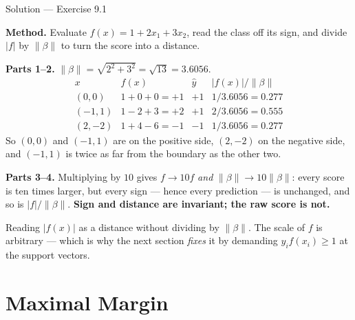 \documentclass[aspectratio=169,11pt]{beamer}
\begin{document}
\begin{frame}{Solution --- Exercise 9.1}
\begin{solutionbox}
  \scriptsize
  \textbf{Method.} Evaluate $f(x)=1+2x_1+3x_2$, read the class off its sign,
  and divide $|f|$ by $\|\beta\|$ to turn the score into a distance.

  \textbf{Parts 1--2.} $\|\beta\|=\sqrt{2^2+3^2}=\sqrt{13}=3.6056$.
  \[
    \begin{array}{l|c|c|c}
      x & f(x) & \hat y & |f(x)|/\|\beta\| \\ \hline
      (0,0)  & 1+0+0 = +1 & +1 & 1/3.6056 = 0.277 \\
      (-1,1) & 1-2+3 = +2 & +1 & 2/3.6056 = 0.555 \\
      (2,-2) & 1+4-6 = -1 & -1 & 1/3.6056 = 0.277
    \end{array}
  \]
  So $(0,0)$ and $(-1,1)$ are on the positive side, $(2,-2)$ on the negative
  side, and $(-1,1)$ is twice as far from the boundary as the other two.

  \textbf{Parts 3--4.} Multiplying by $10$ gives $f\to 10f$ \emph{and}
  $\|\beta\|\to 10\|\beta\|$: every score is ten times larger, but every sign
  --- hence every prediction --- is unchanged, and so is $|f|/\|\beta\|$.
  \textbf{Sign and distance are invariant; the raw score is not.}
\end{solutionbox}
\begin{mistake}
  Reading $|f(x)|$ as a distance without dividing by $\|\beta\|$. The scale of
  $f$ is arbitrary --- which is why the next section \emph{fixes} it by
  demanding $y_i f(x_i)\ge 1$ at the support vectors.
\end{mistake}
\end{frame}

\section{Maximal Margin}
\end{document}
